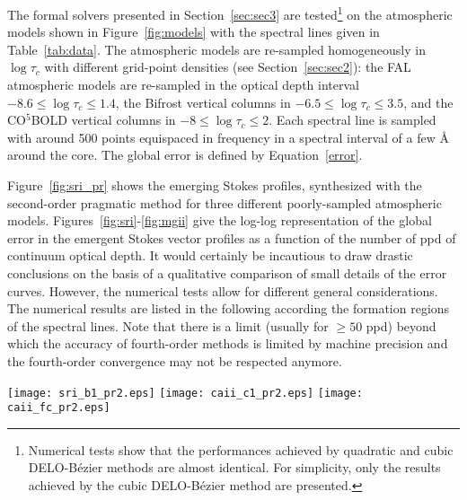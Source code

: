 \documentclass[iop,numberedappendix,twocolappendix,twocolumn]{emulateapj}
\begin{document}
The formal solvers presented in Section~\ref{sec:sec3} are tested\footnote{
Numerical tests show that the performances achieved by quadratic and cubic DELO-B\'ezier methods are almost identical.
For simplicity, only the results achieved by the cubic DELO-B\'ezier method are presented.} on the atmospheric models shown
in Figure~\ref{fig:models} with the spectral lines given in Table~\ref{tab:data}.
The atmospheric models are re-sampled homogeneously in $\log\tau_c$ with different grid-point densities (see Section~\ref{sec:sec2}):
the FAL atmospheric models are re-sampled in the optical depth interval $-8.6\le\log\tau_c\le1.4$, %
the Bifrost vertical columns in $-6.5\le\log\tau_c\le 3.5$,
and the CO$^5$BOLD vertical columns in $-8\le\log\tau_c\le 2$. %
Each spectral line is sampled with around 500 points equispaced in frequency
in a spectral interval of a few {\rm \AA} around the core.  The global error is defined by Equation~\eqref{error}.

Figure~\ref{fig:sri_pr} shows the emerging Stokes profiles,
synthesized with the second-order pragmatic method for three different poorly-sampled atmospheric models.
Figures~\ref{fig:sri}-\ref{fig:mgii} give the log-log representation
of the global error in the emergent Stokes vector profiles as a function of the number of ppd of continuum optical depth.
It would certainly be incautious to draw drastic conclusions on the basis of a qualitative comparison of small details of the error curves.
However, the numerical tests allow for different general considerations. The numerical results are listed in the following according the formation regions of the spectral lines.
Note that there is a limit (usually for  $\ge50$ ppd) beyond which the accuracy of fourth-order methods
is limited by machine precision and the fourth-order convergence may not be respected anymore.
%
\begin{figure*}
\hspace*{-0.5cm}
\texttt{[image: sri\_b1\_pr2.eps]}
\hspace*{-0.40cm}
\texttt{[image: caii\_c1\_pr2.eps]}
\hspace*{-0.40cm}
\texttt{[image: caii\_fc\_pr2.eps]}
\caption{Emerging Stokes profiles calculated with the second-order pragmatic method for
the Sr~{\sc i} line at 4607.3 {\rm \AA} for the Bifrost-1 atmospheric model (first column);
the Ca~{\sc ii} line at 8542.1 {\rm \AA} for the CO$^5$BOLD-2 atmospheric model (second column);
and the Ca~{\sc ii} line at 3933.7 {\rm \AA} for the FALC atmospheric model (third column).
The atmospheric models are described in Figure~\ref{fig:models}.
The different colors indicate different grid-point densities according the coding in the inset at the bottom of the last column.
The reference emergent Stokes profile (solid black) is calculated using a sampling with $10^3$ ppd.}
\label{fig:sri_pr}
\end{figure*}
%
\end{document}
